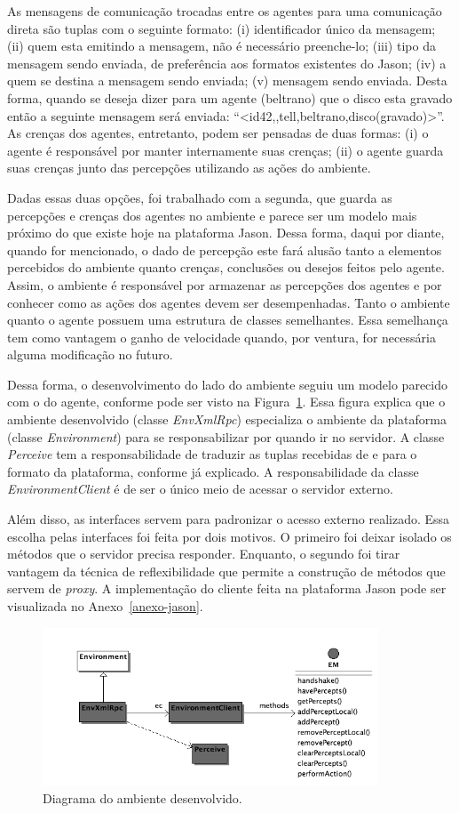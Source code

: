 As mensagens de comunicação trocadas entre os agentes para uma comunicação
direta são tuplas com o seguinte formato: (i) identificador único da
mensagem; (ii) quem esta emitindo a mensagem, não é necessário preenche-lo;
(iii) tipo da mensagem sendo enviada, de preferência aos formatos
existentes do Jason; (iv) a quem se destina a mensagem sendo enviada; (v)
mensagem sendo enviada. Desta forma, quando se deseja dizer para um agente
(beltrano) que o disco esta gravado então a seguinte mensagem será enviada:
``<id42,,tell,beltrano,disco(gravado)>''. As crenças dos agentes,
entretanto, podem ser pensadas de duas formas: (i) o agente é responsável por
manter internamente suas crenças; (ii) o agente guarda suas crenças junto das
percepções utilizando as ações do ambiente.

Dadas essas duas opções, foi trabalhado com a segunda, que guarda as
percepções e crenças dos agentes no ambiente e parece ser um modelo mais
próximo do que existe hoje na plataforma Jason. Dessa forma, daqui por diante,
quando for mencionado, o dado de percepção este fará
alusão tanto a elementos percebidos do ambiente quanto crenças, conclusões ou
desejos feitos pelo agente. Assim, o ambiente é
responsável por armazenar as percepções dos agentes e por conhecer como as
ações dos agentes devem ser desempenhadas. Tanto o ambiente quanto o agente
possuem uma estrutura de classes semelhantes. Essa semelhança tem como
vantagem o ganho de velocidade quando, por ventura, for necessária alguma
modificação no futuro.

Dessa forma, o desenvolvimento do lado do ambiente seguiu um modelo parecido
com o do agente, conforme pode ser visto na Figura~\ref{fig-uml-env}. Essa
figura explica que o ambiente desenvolvido (classe \emph{EnvXmlRpc})
especializa o ambiente da plataforma (classe \emph{Environment}) para se
responsabilizar por quando ir no servidor. A classe \emph{Perceive} tem a
responsabilidade de traduzir as tuplas recebidas de e para o formato da
plataforma, conforme já explicado. A responsabilidade da classe
\emph{EnvironmentClient} é de ser o único meio de acessar o servidor externo.

Além disso, as interfaces servem para padronizar o acesso externo realizado.
Essa escolha pelas interfaces foi feita por dois motivos. O primeiro
foi deixar isolado os métodos que o servidor precisa responder.
Enquanto, o segundo foi tirar vantagem da técnica de reflexibilidade
que permite a construção de métodos que servem de \emph{proxy}. A
implementação do cliente feita na plataforma Jason pode ser visualizada no
Anexo~\ref{anexo-jason}.

\begin{figure}
               \begin{center}
               \includegraphics[width=100mm]{figuras/implXR-env.png}
                \end{center}
                \caption{Diagrama do ambiente desenvolvido.}
                \label{fig-uml-env}
\end{figure}

